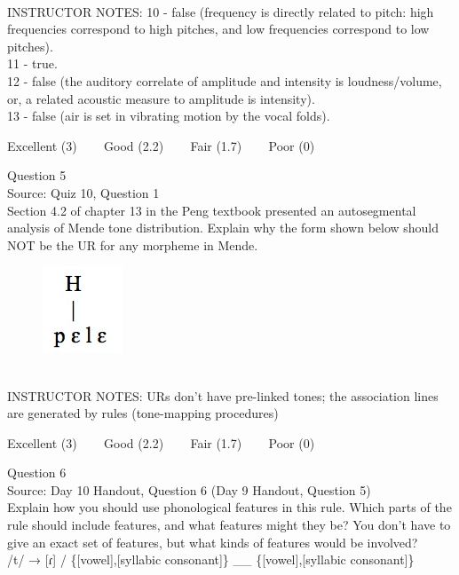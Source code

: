\documentclass[12pt]{article}
\begin{document}
~\\
INSTRUCTOR NOTES: 10 - false (frequency is directly related to pitch: high frequencies correspond to high pitches, and low frequencies correspond to low pitches).\\11 - true.\\12 - false (the auditory correlate of amplitude and intensity is loudness/volume, or, a related acoustic measure to amplitude is intensity).\\13 - false (air is set in vibrating motion by the vocal folds).


\vfill
Excellent (3) ~~~ Good (2.2) ~~~ Fair (1.7) ~~~ Poor (0)
\newpage

{\large Question 5}\\

Source: Quiz 10, Question 1\\

Section 4.2 of chapter 13 in the Peng textbook presented an autosegmental analysis of Mende tone distribution. Explain why the form shown below should NOT be the UR for any morpheme in Mende.\\

\begin{figure}[H]
\includegraphics{../images/mende_house_a.png}
\end{figure}

~\\
INSTRUCTOR NOTES: URs don't have pre-linked tones; the association lines are generated by rules (tone-mapping procedures)


\vfill
Excellent (3) ~~~ Good (2.2) ~~~ Fair (1.7) ~~~ Poor (0)
\newpage

{\large Question 6}\\

Source: Day 10 Handout, Question 6 (Day 9 Handout, Question 5)\\

Explain how you should use phonological features in this rule. Which parts of the rule should include features, and what features might they be? You don't have to give an exact set of features, but what kinds of features would be involved?\\

/t/ → {[ɾ]} / \{{[vowel]},{[syllabic consonant]}\} \_\_ \{{[vowel]},{[syllabic consonant]}\}
\end{document}
